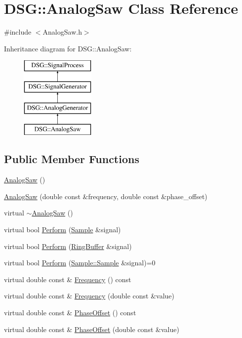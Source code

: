 \hypertarget{classDSG_1_1AnalogSaw}{\section{D\+S\+G\+:\+:Analog\+Saw Class Reference}
\label{classDSG_1_1AnalogSaw}
}


{\ttfamily \#include $<$Analog\+Saw.\+h$>$}

Inheritance diagram for D\+S\+G\+:\+:Analog\+Saw\+:\begin{figure}[H]
\begin{center}
\leavevmode
\includegraphics[height=4.000000cm]{classDSG_1_1AnalogSaw}
\end{center}
\end{figure}
\subsection*{Public Member Functions}
\begin{DoxyCompactItemize}
\item 
\hyperlink{classDSG_1_1AnalogSaw_ae070d24c8d7253be67ffec52445bfc40}{Analog\+Saw} ()
\item 
\hyperlink{classDSG_1_1AnalogSaw_a2b6a21de7b41e541b1dfb016a7c92c3e}{Analog\+Saw} (double const \&frequency, double const \&phase\+\_\+offset)
\item 
virtual \hyperlink{classDSG_1_1AnalogSaw_a30b1d3ac3a8c6c2c093f861e3ead29a8}{$\sim$\+Analog\+Saw} ()
\item 
virtual bool \hyperlink{classDSG_1_1AnalogSaw_ae52d07d0d03f6f1fb92c012cc52ae3eb}{Perform} (\hyperlink{classDSG_1_1Sample}{Sample} \&signal)
\item 
virtual bool \hyperlink{classDSG_1_1AnalogSaw_a14dbd5c7faf6559b9ea79f8eb1ad6af5}{Perform} (\hyperlink{classDSG_1_1RingBuffer}{Ring\+Buffer} \&signal)
\item 
virtual bool \hyperlink{classDSG_1_1SignalProcess_afdb8220100418893950c1161dd24db67}{Perform} (\hyperlink{classDSG_1_1Sample_aaf2e30d73911eccea99b53eeee15b612}{Sample\+::\+Sample} \&signal)=0
\item 
virtual double const \& \hyperlink{classDSG_1_1SignalGenerator_aedac746c5a70818d120858542ecb7c45}{Frequency} () const 
\item 
virtual double const \& \hyperlink{classDSG_1_1SignalGenerator_ae3ce8d45bafabbd86a0f535b15c3cd46}{Frequency} (double const \&value)
\item 
virtual double const \& \hyperlink{classDSG_1_1SignalGenerator_a1ce521847edd0b837fd840998f906b4b}{Phase\+Offset} () const 
\item 
virtual double const \& \hyperlink{classDSG_1_1SignalGenerator_a08b71b1f30ba65e629642c570291dc0e}{Phase\+Offset} (double const \&value)
\end{DoxyCompactItemize}
